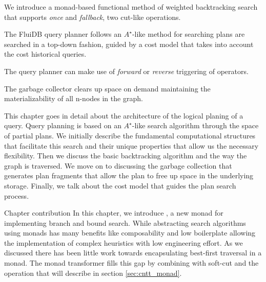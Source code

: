 
\begin{summary}
\item We introduce a monad-based functional method of weighted
  backtracking search that supports \emph{once} and \emph{fallback},
  two cut-like operations.
\item The FluiDB query planner follows an \(A^{\star}\)-like method for
  searching plans are searched in a top-down fashion, guided by a
  cost model that takes into account the cost historical queries.
\item The query planner can make use of \emph{forward} or
  \emph{reverse} triggering of operators.
\item The garbage collector clears up space on demand maintaining the
  materializability of all n-nodes in the graph.
\end{summary}

This chapter goes in detail about the architecture of the logical
planing of a query. Query planning is based on an \(A^{\star}\)-like
search algorithm through the space of partial plans. We initially
describe the fundamental computational structures that facilitate this
search and their unique properties that allow us the necessary
flexibility. Then we discuss the basic backtracking algorithm and the
way the graph is traversed. We move on to discussing the garbage
collection that generates plan fragments that allow the plan to free
up space in the underlying storage. Finally, we talk about the cost
model that guides the plan search process.

\begin{corrected}{Chapter contribution}
  In this chapter, we introduce , a new monad for
  implementing branch and bound search. While abstracting search
  algorithms using monads has many benefits like composability and low
  boilerplate allowing the implementation of complex heuristics with
  low engineering effort. As we discussed there has been little work
  towards encapsulating best-first traversal in a monad. The
   monad transformer fills this gap by combining
   with soft-cut and the  operation that
  will describe in section \ref{sec:cntt_monad}.
\end{corrected}


